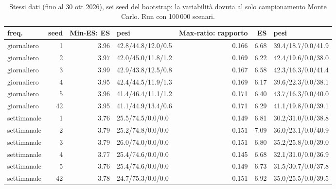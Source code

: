 \begin{table}[htbp]\centering\footnotesize\setlength{\tabcolsep}{3.5pt}
\caption{Stessi dati (fino al 30 ott 2026), sei seed del bootstrap: la variabilit\`a dovuta al solo campionamento Monte Carlo. Run con 100\,000 scenari.}\label{tab:seeds}
\begin{tabular}{lrrlrrl}\toprule
freq. & seed & Min-ES: ES & pesi & Max-ratio: rapporto & ES & pesi \\\midrule
giornaliero & 1 & 3.96 & 42.8/44.8/12.0/0.5 & 0.166 & 6.68 & 39.4/18.7/0.0/41.9 \\
giornaliero & 2 & 3.97 & 42.0/45.0/11.8/1.2 & 0.169 & 6.22 & 42.4/19.6/0.0/38.0 \\
giornaliero & 3 & 3.99 & 42.9/43.8/12.5/0.8 & 0.167 & 6.58 & 42.3/16.3/0.0/41.4 \\
giornaliero & 4 & 3.95 & 42.4/44.5/11.9/1.3 & 0.169 & 6.17 & 39.6/22.3/0.0/38.1 \\
giornaliero & 5 & 3.96 & 41.4/46.4/11.1/1.2 & 0.171 & 6.40 & 43.7/16.3/0.0/40.0 \\
giornaliero & 42 & 3.95 & 41.1/44.9/13.4/0.6 & 0.171 & 6.29 & 41.1/19.8/0.0/39.1 \\
settimanale & 1 & 3.76 & 25.5/74.5/0.0/0.0 & 0.149 & 6.81 & 30.2/31.0/0.0/38.8 \\
settimanale & 2 & 3.79 & 25.2/74.8/0.0/0.0 & 0.151 & 7.09 & 36.0/23.1/0.0/40.9 \\
settimanale & 3 & 3.79 & 26.0/74.0/0.0/0.0 & 0.151 & 6.80 & 35.2/25.8/0.0/39.0 \\
settimanale & 4 & 3.77 & 25.4/74.6/0.0/0.0 & 0.145 & 6.68 & 32.1/31.0/0.0/36.9 \\
settimanale & 5 & 3.76 & 25.4/74.6/0.0/0.0 & 0.149 & 6.73 & 31.5/30.7/0.0/37.8 \\
settimanale & 42 & 3.78 & 24.7/75.3/0.0/0.0 & 0.151 & 6.92 & 35.0/25.5/0.0/39.5 \\
\bottomrule\end{tabular}\end{table}

